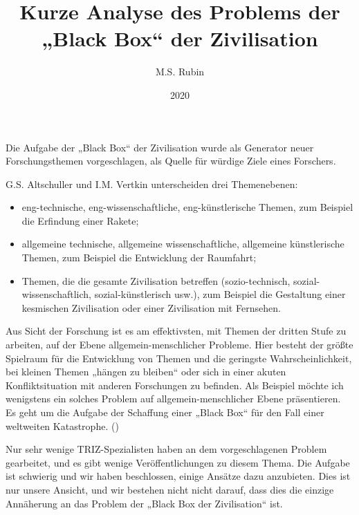 \documentclass[11pt,a4paper]{article}
\title{Kurze Analyse des Problems der „Black Box“ der Zivilisation}
\author{M.S. Rubin}
\date{2020}
\begin{document}
\maketitle

Die Aufgabe der „Black Box“ der Zivilisation wurde als Generator neuer
Forschungsthemen vorgeschlagen, als Quelle für würdige Ziele eines Forschers.

G.S. Altschuller und I.M. Vertkin \cite{Altshuller1991} unterscheiden drei
Themenebenen:
\begin{itemize}
\item eng-technische, eng-wissenschaftliche, eng-künstlerische Themen, zum
  Beispiel die Erfindung einer Rakete;
\item allgemeine technische, allgemeine wissenschaftliche, allgemeine
  künstlerische Themen, zum Beispiel die Entwicklung der Raumfahrt; 
\item Themen, die die gesamte Zivilisation betreffen (sozio-technisch,
  sozial-wissenschaftlich, sozial-künstlerisch usw.), zum Beispiel die
  Gestaltung einer kesmischen Zivilisation oder einer Zivilisation mit
  Fernsehen.
\end{itemize}

Aus Sicht der Forschung ist es am effektivsten, mit Themen der dritten Stufe
zu arbeiten, auf der Ebene allgemein-menschlicher Probleme. Hier besteht der
größte Spielraum für die Entwicklung von Themen und die geringste
Wahrscheinlichkeit, bei kleinen Themen „hängen zu bleiben“ oder sich in einer
akuten Konfliktsituation mit anderen Forschungen zu befinden. Als Beispiel
möchte ich wenigstens ein solches Problem auf allgemein-menschlicher Ebene
präsentieren. Es geht um die Aufgabe der Schaffung einer „Black Box“ für den
Fall einer weltweiten Katastrophe. (\cite[S. 166-168]{Altshuller1991})

Nur sehr wenige TRIZ-Spezialisten haben an dem vorgeschlagenen Problem
gearbeitet, und es gibt wenige Veröffentlichungen zu diesem Thema. Die Aufgabe
ist schwierig und wir haben beschlossen, einige Ansätze dazu anzubieten. Dies
ist nur unsere Ansicht, und wir bestehen nicht nicht darauf, dass dies die
einzige Annäherung an das Problem der „Black Box der Zivilisation“ ist.
\end{document}
